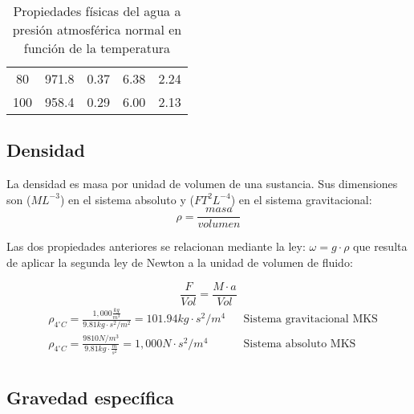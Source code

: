 \begin{table}[h!]
\begin{tabular}{@{}ccccc@{}}
        80                                                                  & 971.8                                                                & 0.37                                                                               & 6.38                                                                             & 2.24                                                                               \\
        100                                                                 & 958.4                                                                & 0.29                                                                               & 6.00                                                                             & 2.13                                                                               \\ \bottomrule
    \end{tabular}
    \caption{Propiedades físicas del agua a presión atmosférica normal en función de la temperatura}
    \label{tabhb1}
    \end{table}

\subsection{Densidad}

La densidad es masa por unidad de volumen de una sustancia. Sus dimensiones son ($ML^{-3}$) en el sistema absoluto y ($FT^2L^{-4}$) en el sistema gravitacional: 
\begin{equation}
    \rho=\frac{masa}{volumen}
\end{equation}

Las dos propiedades anteriores se relacionan mediante la ley: $\omega=g\cdot\rho$ que resulta de aplicar la segunda ley de Newton a la unidad de volumen de fluido: 

\begin{equation}
    \frac{F}{Vol}=\frac{M\cdot a}{Vol}
\end{equation}
\begin{align*}
    &\rho_{4^{\circ}C}=\frac{1,000\frac{kg}{m^3}}{9.81kg\cdot s^2/m^2}=101.94kg\cdot s^2/m^4&&\text{Sistema gravitacional MKS}\\
    &\rho_{4^{\circ}C}=\frac{9810N/m^3}{9.81kg\cdot \frac{m}{s^2}}=1,000N\cdot s^2/m^4&&\text{Sistema absoluto MKS}\\
\end{align*}

\subsection{Gravedad específica}

